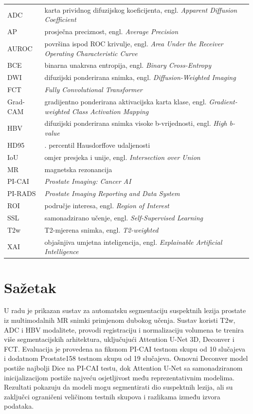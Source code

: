 \documentclass[a4paper,12pt,oneside]{article}
\let\sectionwithoutpagebreak\section
\renewcommand{\section}{\clearpage\sectionwithoutpagebreak}%
\begin{document}
\begin{tabular}{>{\raggedright\arraybackslash}p{} >{\raggedright\arraybackslash}p{}}
ADC & karta prividnog difuzijskog koeficijenta, engl. \textit{Apparent Diffusion Coefficient} \\
AP & prosječna preciznost, engl. \textit{Average Precision} \\
AUROC & površina ispod ROC krivulje, engl. \textit{Area Under the Receiver Operating Characteristic Curve} \\
BCE & binarna unakrsna entropija, engl. \textit{Binary Cross-Entropy} \\
DWI & difuzijski ponderirana snimka, engl. \textit{Diffusion-Weighted Imaging} \\
FCT & \textit{Fully Convolutional Transformer} \\
Grad-CAM & gradijentno ponderirana aktivacijska karta klase, engl. \textit{Gradient-weighted Class Activation Mapping} \\
HBV & difuzijski ponderirana snimka visoke b-vrijednosti, engl. \textit{High b-value} \\
HD95 & 95. percentil Hausdorffove udaljenosti \\
IoU & omjer presjeka i unije, engl. \textit{Intersection over Union} \\
MR & magnetska rezonancija \\
PI-CAI & \textit{Prostate Imaging: Cancer AI} \\
PI-RADS & \textit{Prostate Imaging Reporting and Data System} \\
ROI & područje interesa, engl. \textit{Region of Interest} \\
SSL & samonadzirano učenje, engl. \textit{Self-Supervised Learning} \\
T2w & T2-mjerena snimka, engl. \textit{T2-weighted} \\
XAI & objašnjiva umjetna inteligencija, engl. \textit{Explainable Artificial Intelligence} \\
\end{tabular}

\newpage
\section*{Sažetak}

U radu je prikazan sustav za automatsku segmentaciju suspektnih lezija prostate iz multimodalnih MR snimki primjenom dubokog učenja. Sustav koristi T2w, ADC i HBV modalitete, provodi registraciju i normalizaciju volumena te trenira više segmentacijskih arhitektura, uključujući Attention U-Net 3D, Deconver i FCT. Evaluacija je provedena na fiksnom PI-CAI testnom skupu od 10 slučajeva i dodatnom Prostate158 testnom skupu od 19 slučajeva. Osnovni Deconver model postiže najbolji Dice na PI-CAI testu, dok Attention U-Net sa samonadziranom inicijalizacijom postiže najveću osjetljivost među reprezentativnim modelima. Rezultati pokazuju da modeli mogu segmentirati dio suspektnih lezija, ali su zaključci ograničeni veličinom testnih skupova i razlikama između izvora podataka.
\end{document}
